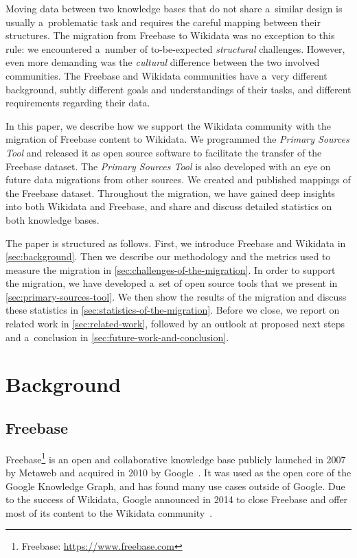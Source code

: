 \documentclass{acm_proc_article-sp}
\begin{document}
Moving data between two knowledge bases that do not share a~similar design
is usually a~problematic task and requires the careful mapping between their structures.
The migration from Freebase to Wikidata was no exception to this rule:
we encountered a~number of to-be-expected \emph{structural} challenges.
However, even more demanding was the \emph{cultural} difference between the two involved communities.
The Freebase and Wikidata communities have a~very different background,
subtly different goals and understandings of their tasks,
and different requirements regarding their data.

In this paper, we describe how we support the Wikidata community with
the migration of Freebase content to Wikidata.
We programmed the \emph{Primary Sources Tool} and
released it as open source software to facilitate the transfer of the Freebase dataset.
The \emph{Primary Sources Tool} is also developed with an eye on
future data migrations from other sources.
We created and published mappings of the Freebase dataset.
Throughout the migration, we have gained deep insights into both Wikidata and Freebase,
and share and discuss detailed statistics on both knowledge bases. 

The paper is structured as follows.
First, we introduce Freebase and Wikidata in \autoref{sec:background}.
Then we describe our methodology and the metrics used to measure the migration
in \autoref{sec:challenges-of-the-migration}.
In order to support the migration, we have developed a~set of open source tools
that we present in \autoref{sec:primary-sources-tool}.
We then show the results of the migration
and discuss these statistics in \autoref{sec:statistics-of-the-migration}.
Before we close, we report on related work in \autoref{sec:related-work},
followed by an outlook at proposed next steps
and a~conclusion in \autoref{sec:future-work-and-conclusion}.

\section{Background}\label{sec:background}

\subsection{Freebase}

Freebase\footnote{Freebase: \url{https://www.freebase.com}} is an open and
collaborative knowledge base publicly launched in 2007 by Metaweb and 
acquired in 2010 by Google~\cite{freebase}.
It was used as the open core of the Google Knowledge Graph,
and has found many use cases outside of Google.
Due to the success of Wikidata,
Google announced in 2014 to close Freebase and offer most of its content to the
Wikidata community~\cite{freebase2014shutdown,freebase-end}.
\end{document}
